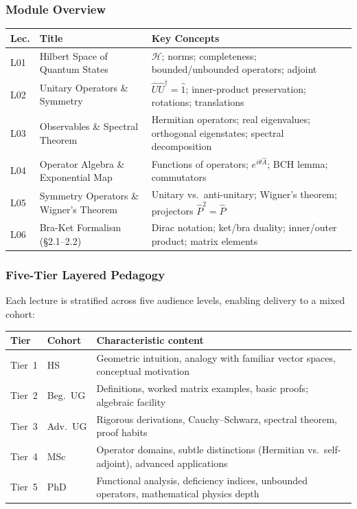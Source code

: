\documentclass[11pt,a4paper]{article}
\begin{document}
\subsubsection*{Module Overview}

{\footnotesize
\begin{center}
\begin{tabular}{@{}lp{4.2cm}p{6.8cm}@{}}
\toprule
\textbf{Lec.} & \textbf{Title} & \textbf{Key Concepts}\\
\midrule
L01 & Hilbert Space of Quantum States & $\mathcal{H}$; norms; completeness; bounded/unbounded operators; adjoint\\
L02 & Unitary Operators \& Symmetry & $\hat{U}\hat{U}^\dagger=\hat{1}$; inner-product preservation; rotations; translations\\
L03 & Observables \& Spectral Theorem & Hermitian operators; real eigenvalues; orthogonal eigenstates; spectral decomposition\\
L04 & Operator Algebra \& Exponential Map & Functions of operators; $e^{i\theta\hat{A}}$; BCH lemma; commutators\\
L05 & Symmetry Operators \& Wigner's Theorem & Unitary vs.\ anti-unitary; Wigner's theorem; projectors $\hat{P}^2=\hat{P}$\\
L06 & Bra-Ket Formalism (\S2.1--2.2) & Dirac notation; ket/bra duality; inner/outer product; matrix elements\\
\bottomrule
\end{tabular}
\end{center}
}

\subsubsection*{Five-Tier Layered Pedagogy}

Each lecture is stratified across five audience levels, enabling delivery to a mixed cohort:

\begin{center}
\begin{tabular}{llp{9cm}}
\toprule
\textbf{Tier} & \textbf{Cohort} & \textbf{Characteristic content}\\
\midrule
Tier~1 & HS       & Geometric intuition, analogy with familiar vector spaces, conceptual motivation\\
Tier~2 & Beg.\ UG & Definitions, worked matrix examples, basic proofs; algebraic facility\\
Tier~3 & Adv.\ UG & Rigorous derivations, Cauchy--Schwarz, spectral theorem, proof habits\\
Tier~4 & MSc      & Operator domains, subtle distinctions (Hermitian vs.\ self-adjoint), advanced applications\\
Tier~5 & PhD      & Functional analysis, deficiency indices, unbounded operators, mathematical physics depth\\
\bottomrule
\end{tabular}
\end{center}
\end{document}
